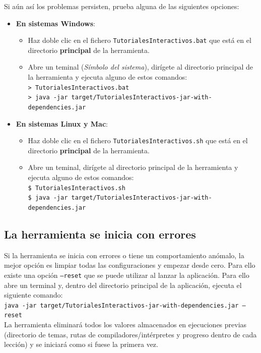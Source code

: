 \documentclass[]{article}
\begin{document}
Si aún así los problemas persisten, prueba alguna de las siguientes opciones:
\begin{itemize}
	\item \textbf{En sistemas Windows}: 
	\begin{itemize}
	\item Haz doble clic en el fichero \texttt{TutorialesInteractivos.bat} que está en el directorio \textbf{principal} de la herramienta. 
	\item Abre un teminal (\emph{Símbolo del sistema}), dirígete al directorio principal de la herramienta y ejecuta alguno de estos comandos:
	\\
	{\small \texttt{>\ TutorialesInteractivos.bat}}\\
	{\small \texttt{>\ java -jar target/TutorialesInteractivos-jar-with-dependencies.jar}}\\
	\end{itemize}
	\item \textbf{En sistemas Linux y Mac}:
	\begin{itemize}
		\item Haz doble clic en el fichero \texttt{TutorialesInteractivos.sh} que está en el directorio \textbf{principal} de la herramienta. 
		\item Abre un teminal, dirígete al directorio principal de la herramienta y ejecuta alguno de estos comandos:
		\\
		{\small \texttt{\$ TutorialesInteractivos.sh}}\\
		{\small \texttt{\$ java -jar target/TutorialesInteractivos-jar-with-dependencies.jar}}\\
	\end{itemize}
\end{itemize}	
	


\subsection{La herramienta se inicia con errores}
Si la herramienta se inicia con errores o tiene un comportamiento anómalo, la mejor opción es limpiar todas las configuraciones y empezar desde cero. Para ello existe una opción \texttt{--reset} que se puede utilizar al lanzar la aplicación. Para ello abre un terminal y, dentro del directorio principal de la aplicación, ejecuta el siguiente comando:\\[0.2cm]
{\small \texttt{java -jar target/TutorialesInteractivos-jar-with-dependencies.jar --reset}}\\[0.2cm]
La herramienta eliminará todos los valores almacenados en ejecuciones previas (directorio de temas, rutas de compiladores/intérpretes y progreso dentro de cada lección) y se iniciará como si fuese la primera vez. 
\end{document}
